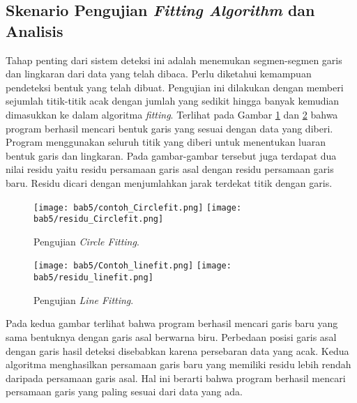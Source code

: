 
\subsection{Skenario Pengujian \textit{Fitting Algorithm} dan Analisis}
\label{subsec:Skenario52}

Tahap penting dari sistem deteksi ini adalah menemukan segmen-segmen garis dan lingkaran dari data yang telah dibaca. Perlu diketahui kemampuan pendeteksi bentuk yang telah dibuat. Pengujian ini dilakukan dengan memberi sejumlah titik-titik acak dengan jumlah yang sedikit hingga banyak kemudian dimasukkan ke dalam algoritma \textit{fitting}. Terlihat pada Gambar \ref*{fig:Ch05_P_circfit} dan \ref*{fig:Ch05_P_linefit} bahwa program berhasil mencari bentuk garis yang sesuai dengan data yang diberi. Program menggunakan seluruh titik yang diberi untuk menentukan luaran bentuk garis dan lingkaran. Pada gambar-gambar tersebut juga terdapat dua nilai residu yaitu residu persamaan garis asal dengan residu persamaan garis baru. Residu dicari dengan menjumlahkan jarak terdekat titik dengan garis.
\begin{figure}[H]
    \centering
    \texttt{[image: bab5/contoh\_Circlefit.png]}
    \texttt{[image: bab5/residu\_Circlefit.png]}
    \caption{Pengujian \textit{Circle Fitting}.}
        \label{fig:Ch05_P_circfit}
\end{figure}

\begin{figure}[H]
    \centering
    \texttt{[image: bab5/Contoh\_linefit.png]}
    \texttt{[image: bab5/residu\_linefit.png]}
    \caption{Pengujian \textit{Line Fitting}.}
        \label{fig:Ch05_P_linefit}
\end{figure}
Pada kedua gambar terlihat bahwa program berhasil mencari garis baru yang sama bentuknya dengan garis asal berwarna biru.
Perbedaan posisi garis asal dengan garis hasil deteksi disebabkan karena persebaran data yang acak. Kedua algoritma menghasilkan persamaan garis baru yang memiliki residu lebih rendah daripada persamaan garis asal. Hal ini berarti bahwa program berhasil mencari persamaan garis yang paling sesuai dari data yang ada. 

